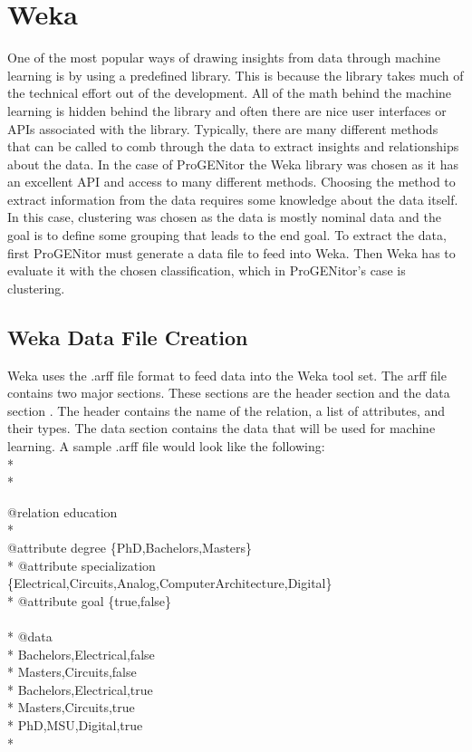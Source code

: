 \section{Weka}
\label{sect:weka}
One of the most popular ways of drawing insights from data through machine
learning is by using a predefined library.  This is because the library takes
much of the technical effort out of the development.  All of the math behind the
machine learning is hidden behind the library and often there are nice user
interfaces or APIs associated with the library.  Typically, there are many
different methods that can be called to comb through the data to extract
insights and relationships about the data.  In the case of ProGENitor the Weka
library was chosen as it has an excellent API and access to many different
methods.  Choosing the method to extract information from the data requires some
knowledge about the data itself.  In this case, clustering was chosen as the
data is mostly nominal data and the goal is to define some grouping that leads
to the end goal.  To extract the data, first ProGENitor must generate a data
file to feed into Weka.  Then Weka has to evaluate it with the chosen
classification, which in ProGENitor's case is clustering.

\subsection{Weka Data File Creation}
Weka uses the .arff file format to feed data into the Weka tool set.  The arff
file contains two major sections.  These sections are the header section and the
data section \cite{arff}.  The header contains the name of the relation, a list
of attributes, and their types.  The data section contains the data that will
be used for machine learning.  A sample .arff file would look like the
following:\\*
\\*
\begin{tt}
\begin{footnotesize}
@relation education\\*
\\
@attribute degree \{PhD,Bachelors,Masters\}\\*
@attribute specialization
\{Electrical,Circuits,Analog,Computer\newline \indent Architecture,Digital\}\\*
@attribute goal \{true,false\}\\ \\* @data\\*
Bachelors,Electrical,false\\*
Masters,Circuits,false\\*
Bachelors,Electrical,true\\*
Masters,Circuits,true\\*
PhD,MSU,Digital,true\\*
\end{footnotesize}
\end{tt}

